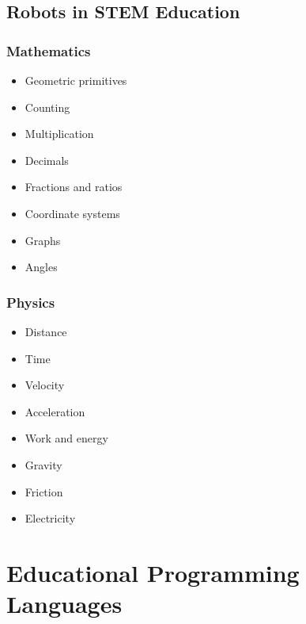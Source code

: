 \documentclass{beamer}
\begin{document}
\subsection{Robots in STEM Education} 
\begin{frame}
\frametitle{Mathematics}
\begin{itemize}[<+>]
    \item Geometric primitives
    \item Counting
    \item Multiplication
    \item Decimals
    \item Fractions and ratios
    \item Coordinate systems
    \item Graphs
    \item Angles
\end{itemize}
\end{frame}


\begin{frame}
\frametitle{Physics}
\begin{itemize}[<+>]
    \item Distance
    \item Time
    \item Velocity
    \item Acceleration
    \item Work and energy
    \item Gravity
    \item Friction
    \item Electricity
\end{itemize}
\end{frame}


\section{Educational Programming Languages} 
\end{document}
